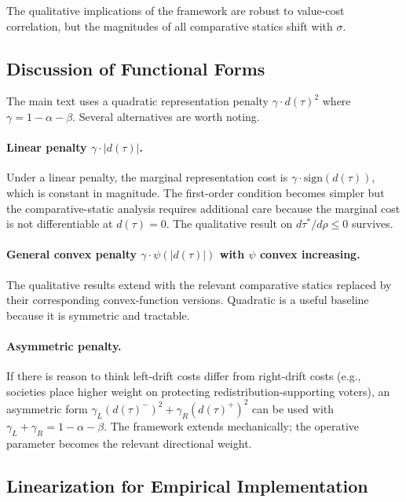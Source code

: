 The qualitative implications of the framework are robust to value-cost correlation, but the magnitudes of all comparative statics shift with $\sigma$.

\subsection{Discussion of Functional Forms}
\label{ssec:functional_forms}

The main text uses a quadratic representation penalty $\gamma \cdot d(\tau)^2$ where $\gamma = 1 - \alpha - \beta$. Several alternatives are worth noting.

\paragraph{Linear penalty $\gamma \cdot |d(\tau)|$.} Under a linear penalty, the marginal representation cost is $\gamma \cdot \text{sign}(d(\tau))$, which is constant in magnitude. The first-order condition becomes simpler but the comparative-static analysis requires additional care because the marginal cost is not differentiable at $d(\tau) = 0$. The qualitative result on $d\tau^*/d\rho \leq 0$ survives.

\paragraph{General convex penalty $\gamma \cdot \psi(|d(\tau)|)$ with $\psi$ convex increasing.} The qualitative results extend with the relevant comparative statics replaced by their corresponding convex-function versions. Quadratic is a useful baseline because it is symmetric and tractable.

\paragraph{Asymmetric penalty.} If there is reason to think left-drift costs differ from right-drift costs (e.g., societies place higher weight on protecting redistribution-supporting voters), an asymmetric form $\gamma_L (d(\tau)^-)^2 + \gamma_R (d(\tau)^+)^2$ can be used with $\gamma_L + \gamma_R = 1 - \alpha - \beta$. The framework extends mechanically; the operative parameter becomes the relevant directional weight.

\subsection{Linearization for Empirical Implementation}
\label{ssec:linearization}

